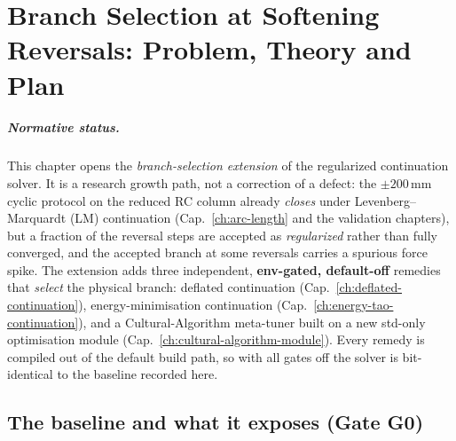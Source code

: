 
\chapter{Branch Selection at Softening Reversals: Problem, Theory and Plan}
\label{ch:branch-selection-reversals}

\paragraph{Normative status.}
This chapter opens the \emph{branch-selection extension} of the
regularized continuation solver. It is a research growth path, not a
correction of a defect: the \(\pm200\,\mathrm{mm}\) cyclic protocol on
the reduced RC column already \emph{closes} under Levenberg--Marquardt
(LM) continuation (Cap.~\ref{ch:arc-length} and the validation
chapters), but a fraction of the reversal steps are accepted as
\emph{regularized} rather than fully converged, and the accepted branch
at some reversals carries a spurious force spike. The extension adds
three independent, \textbf{env-gated, default-off} remedies that
\emph{select} the physical branch: deflated continuation
(Cap.~\ref{ch:deflated-continuation}), energy-minimisation continuation
(Cap.~\ref{ch:energy-tao-continuation}), and a Cultural-Algorithm
meta-tuner built on a new std-only optimisation module
(Cap.~\ref{ch:cultural-algorithm-module}). Every remedy is compiled out
of the default build path, so with all gates off the solver is
bit-identical to the baseline recorded here.

\section{The baseline and what it exposes (Gate G0)}

